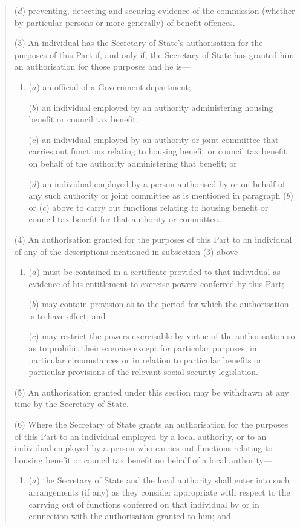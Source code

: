\documentclass[12pt,a4paper]{article}
\begin{document}
\begin{quotation}
\begin{enumerate}
($d$) preventing, detecting and securing evidence of the commission (whether by particular persons or more generally) of benefit offences.
\end{enumerate}

(3) An individual has the Secretary of State’s authorisation for the purposes of this Part if, and only if, the Secretary of State has granted him an authorisation for those purposes and he is—
\begin{enumerate}\item[]
($a$) an official of a Government department;

($b$) an individual employed by an authority administering housing benefit or council tax benefit;

($c$) an individual employed by an authority or joint committee that carries out functions relating to housing benefit or council tax benefit on behalf of the authority administering that benefit; or

($d$) an individual employed by a person authorised by or on behalf of any such authority or joint committee as is mentioned in paragraph ($b$)  or ($c$)  above to carry out functions relating to housing benefit or council tax benefit for that authority or committee.
\end{enumerate}

(4) An authorisation granted for the purposes of this Part to an individual of any of the descriptions mentioned in subsection (3)  above—
\begin{enumerate}\item[]
($a$) must be contained in a certificate provided to that individual as evidence of his entitlement to exercise powers conferred by this Part;

($b$) may contain provision as to the period for which the authorisation is to have effect; and

($c$) may restrict the powers exercisable by virtue of the authorisation so as to prohibit their exercise except for particular purposes, in particular circumstances or in relation to particular benefits or particular provisions of the relevant social security legislation.
\end{enumerate}

(5) An authorisation granted under this section may be withdrawn at any time by the Secretary of State.

(6) Where the Secretary of State grants an authorisation for the purposes of this Part to an individual employed by a local authority, or to an individual employed by a person who carries out functions relating to housing benefit or council tax benefit on behalf of a local authority—
\begin{enumerate}\item[]
($a$) the Secretary of State and the local authority shall enter into such arrangements (if any) as they consider appropriate with respect to the carrying out of functions conferred on that individual by or in connection with the authorisation granted to him; and


\end{enumerate}
\end{quotation}
\end{document}
